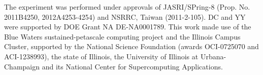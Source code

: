 \documentclass[twocolumn,showpacs,showkeys,fleqn,prl,superscriptaddress]{revtex4}%
\begin{document}
The experiment was performed under approvals of JASRI/SPring-8 (Prop. No. 2011B4250, 2012A4253-4254) and NSRRC, Taiwan (2011-2-105).
DC and YY were supported by DOE Grant NA DE-NA0001789.
This work made use of the Blue Waters sustained-petascale computing project and the Illinois Campus Cluster, supported by the National Science Foundation (awards OCI-0725070 and ACI-1238993), the state of Illinois, the University of Illinois at Urbana-Champaign and its National Center for Supercomputing Applications.
       

%
%



\end{document}
